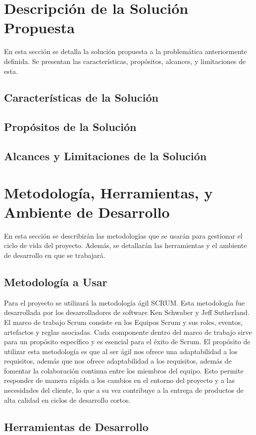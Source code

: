 \documentclass[letterpaper, 10pt]{article}
\begin{document}
\section{Descripción de la Solución Propuesta}
En esta sección se detalla la solución propuesta a la problemática anteriormente definida. Se presentan las características, propósitos, alcances, y limitaciones de esta.
\subsection{Características de la Solución}
\subsection{Propósitos de la Solución}
\subsection{Alcances y Limitaciones de la Solución}

\section{Metodología, Herramientas, y Ambiente de Desarrollo}
En esta sección se describirán las metodologías que se usarán para gestionar el ciclo de vida del proyecto. Además, se detallarán las herramientas y el ambiente de desarrollo en que se trabajará.
\subsection{Metodología a Usar}
Para el proyecto se utilizará la metodología ágil SCRUM\cite{1}. Esta metodología fue desarrollada por los desarrolladores de software Ken Schwaber y Jeff Sutherland. El marco de trabajo Scrum consiste en los Equipos Scrum y sus roles, eventos, artefactos y reglas asociadas\cite{2}. Cada componente dentro del marco de trabajo sirve para un propósito específico y es esencial para el éxito de Scrum. El propósito de utilizar esta metodología es que al ser ágil nos ofrece una adaptabilidad a los requisitos, además que nos ofrece adaptabilidad a los requisitos, además de fomentar la colaboración continua entre los miembros del equipo. Esto permite responder de manera rápida a los cambios en el entorno del proyecto y a las necesidades del cliente, lo que a su vez contribuye a la entrega de productos de alta calidad en ciclos de desarrollo cortos.
\subsection{Herramientas de Desarrollo}
\end{document}
